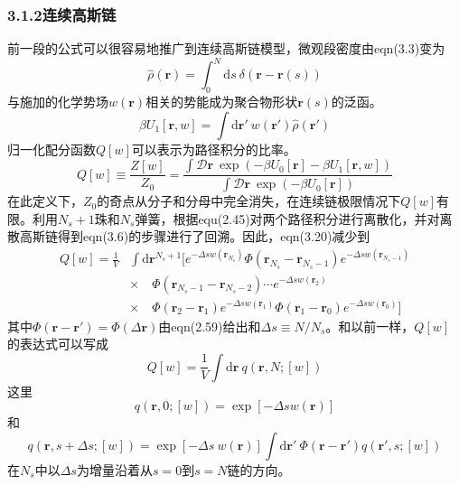 \subsubsection{3.1.2连续高斯链}
前一段的公式可以很容易地推广到连续高斯链模型，微观段密度由eqn(3.3)变为
\begin{equation}
\hat{\rho}(\mathbf{r})=\int_0^N\mathrm{d}s~\delta(\mathbf{r}-\mathbf{r}(s))
\end{equation}
与施加的化学势场$w(\mathbf{r})$相关的势能成为聚合物形状$\mathbf{r}(s)$的泛函。
\begin{equation}
\beta U_1[\mathbf{r},w]=\int\mathrm{d}\mathbf{r}'~w(\mathbf{r}')\hat{\rho}(\mathbf{r}')
\end{equation}
归一化配分函数$Q[w]$可以表示为路径积分的比率。
\begin{equation}
Q[w]\equiv\frac{Z[w]}{Z_0}=\frac{\int\mathcal{D}\mathbf{r}~\exp(-\beta U_0[\mathbf{r}]-\beta U_1[\mathbf{r},w])}{\int\mathcal{D}\mathbf{r}~\exp(-\beta U_0[\mathbf{r}])}
\end{equation}
在此定义下，$Z_0$的奇点从分子和分母中完全消失，在连续链极限情况下$Q[w]$有限。利用$N_s+1$珠和$N_s$弹簧，根据equ(2.45)对两个路径积分进行离散化，并对离散高斯链得到eqn(3.6)的步骤进行了回溯。因此，eqn(3.20)减少到
\begin{equation}
\begin{aligned}
Q[w]=\frac{1}{V}&\int\mathrm{d}\mathbf{r}^{N_s+1}[e^{-\Delta sw(\mathbf{r}_{N_s})}\Phi(\mathbf{r}_{N_s}-\mathbf{r}_{N_s-1})e^{-\Delta sw(\mathbf{r}_{N_s-1})}\\
&\times\quad\Phi(\mathbf{r}_{N_s-1}-\mathbf{r}_{N_s-2})\cdots e^{-\Delta sw(\mathbf{r}_2)}\\
&\times\quad\Phi(\mathbf{r}_2-\mathbf{r}_1)e^{-\Delta sw(\mathbf{r}_1)}\Phi(\mathbf{r}_1-\mathbf{r}_0)e^{-\Delta sw(\mathbf{r}_0)}]
\end{aligned}
\end{equation}
其中$\Phi(\mathbf{r}-\mathbf{r}')=\Phi(\Delta\mathbf{r})$由eqn(2.59)给出和$\Delta s\equiv N/N_s$。和以前一样，$Q[w]$的表达式可以写成
\begin{equation}
Q[w]=\frac{1}{V}\int\mathrm{d}\mathbf{r}~q(\mathbf{r},N;[w])
\end{equation}
这里
\begin{equation}
q(\mathbf{r},0;[w])=\exp[-\Delta sw(\mathbf{r})]
\end{equation}
和
\begin{equation}
q(\mathbf{r},s+\Delta s;[w])=\exp[-\Delta s~w(\mathbf{r})]\int\mathrm{d}\mathbf{r}'~\Phi(\mathbf{r}-\mathbf{r}')q(\mathbf{r}',s;[w])
\end{equation}
在$N_s$中以$\Delta s$为增量沿着从$s=0$到$s=N$链的方向。

